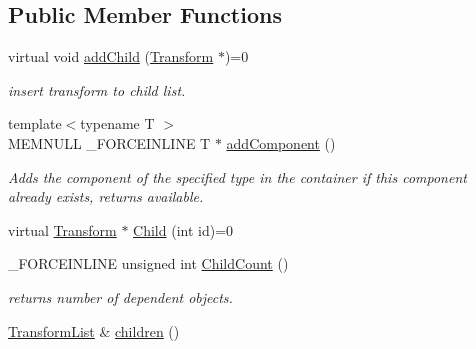 \subsection*{Public Member Functions}
\begin{DoxyCompactItemize}
\item 
\hypertarget{classcsad_1_1_transform_af9ec56591d43d2e55e7c9ba3587cea14}{virtual void \hyperlink{classcsad_1_1_transform_af9ec56591d43d2e55e7c9ba3587cea14}{add\-Child} (\hyperlink{classcsad_1_1_transform}{Transform} $\ast$)=0}\label{classcsad_1_1_transform_af9ec56591d43d2e55e7c9ba3587cea14}

\begin{DoxyCompactList}\small\item\em insert transform to child list. \end{DoxyCompactList}\item 
\hypertarget{classcsad_1_1_transform_a7fa7d1d5f5ab54cc4574cda8a68fa003}{{\footnotesize template$<$typename T $>$ }\\M\-E\-M\-N\-U\-L\-L \-\_\-\-F\-O\-R\-C\-E\-I\-N\-L\-I\-N\-E T $\ast$ \hyperlink{classcsad_1_1_transform_a7fa7d1d5f5ab54cc4574cda8a68fa003}{add\-Component} ()}\label{classcsad_1_1_transform_a7fa7d1d5f5ab54cc4574cda8a68fa003}

\begin{DoxyCompactList}\small\item\em Adds the component of the specified type in the container if this component already exists, returns available. \end{DoxyCompactList}\item 
virtual \hyperlink{classcsad_1_1_transform}{Transform} $\ast$ \hyperlink{classcsad_1_1_transform_acc5f53fea600a3a528dfd2b92eb941ab}{Child} (int id)=0
\item 
\hypertarget{classcsad_1_1_transform_a63391ebbf1ad110f5f04c3df85eaa4b7}{\-\_\-\-F\-O\-R\-C\-E\-I\-N\-L\-I\-N\-E unsigned int \hyperlink{classcsad_1_1_transform_a63391ebbf1ad110f5f04c3df85eaa4b7}{Child\-Count} ()}\label{classcsad_1_1_transform_a63391ebbf1ad110f5f04c3df85eaa4b7}

\begin{DoxyCompactList}\small\item\em returns number of dependent objects. \end{DoxyCompactList}\item 
\hypertarget{classcsad_1_1_transform_a9655cfd6b41096dcb4fc684d64f68be8}{\hyperlink{classbt_1_1_sort_void_vector}{Transform\-List} \& \hyperlink{classcsad_1_1_transform_a9655cfd6b41096dcb4fc684d64f68be8}{children} ()}\label{classcsad_1_1_transform_a9655cfd6b41096dcb4fc684d64f68be8}


\end{DoxyCompactItemize}
